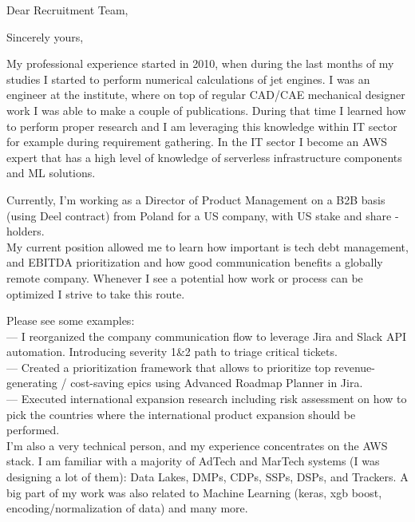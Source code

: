 \documentclass[11pt,a4paper,sans]{moderncv} %
\begin{document}
\date{\today} %
\opening{Dear Recruitment Team,}
\closing{Sincerely yours,} %

\makelettertitle{}

My professional experience started in 2010, when during the last months of my studies I started to perform numerical calculations of jet engines.
I was an engineer at the institute, where on top of regular CAD/CAE mechanical designer work I was able to make a couple of publications.
During that time I learned how to perform proper research and I am leveraging this knowledge within IT sector for example during requirement gathering.
In the IT sector I become an AWS expert that has a high level of knowledge of serverless infrastructure components and ML solutions.

Currently, I'm working as a Director of Product Management on a B2B basis (using Deel contract) from Poland for a US company, with US stake and share -holders.\\
My current position allowed me to learn how important is tech debt management, and EBITDA prioritization and how good communication benefits a globally remote company.
Whenever I see a potential how work or process can be optimized I strive to take this route.

Please see some examples:\\
  --- I reorganized the company communication flow to leverage Jira and Slack API automation. Introducing severity 1\&2 path to triage critical tickets. \\
  --- Created a prioritization framework that allows to prioritize top revenue-generating / cost-saving epics using Advanced Roadmap Planner in Jira. \\
  --- Executed international expansion research including risk assessment on how to pick the countries where the international product expansion should be performed. \\

I'm also a very technical person, and my experience concentrates on the AWS stack. I am familiar with a majority of AdTech and MarTech systems (I was designing a lot of them): Data Lakes, DMPs, CDPs, SSPs, DSPs, and Trackers. A big part of my work was also related to Machine Learning (keras, xgb boost, encoding/normalization of data) and many more. \\
\end{document}
